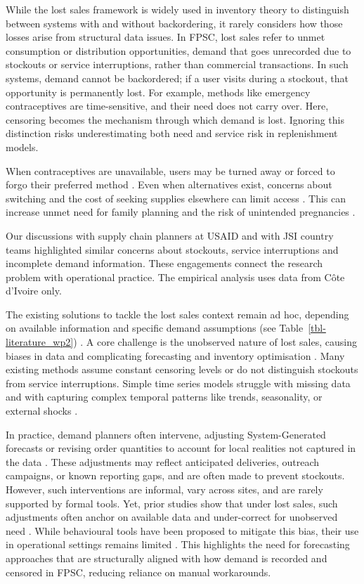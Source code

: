 \documentclass[
  11pt,
  authoryear,
  doubleblind,
  3p]{elsarticle}
\begin{document}
While the lost sales framework is widely used in inventory theory to
distinguish between systems with and without backordering, it rarely
considers how those losses arise from structural data issues. In FPSC,
lost sales refer to unmet consumption or distribution opportunities,
demand that goes unrecorded due to stockouts or service interruptions,
rather than commercial transactions. In such systems, demand cannot be
backordered; if a user visits during a stockout, that opportunity is
permanently lost. For example, methods like emergency contraceptives are
time-sensitive, and their need does not carry over. Here, censoring
becomes the mechanism through which demand is lost. Ignoring this
distinction risks underestimating both need and service risk in
replenishment models.

When contraceptives are unavailable, users may be turned away or forced
to forgo their preferred method \citep{sedgh2016}. Even when
alternatives exist, concerns about switching and the cost of seeking
supplies elsewhere can limit access \citep{karimi2021, RHSC2016}. This
can increase unmet need for family planning and the risk of unintended
pregnancies \citep{sully2020}.

Our discussions with supply chain planners at USAID and with JSI country
teams highlighted similar concerns about stockouts, service
interruptions and incomplete demand information. These engagements
connect the research problem with operational practice. The empirical
analysis uses data from Côte d'Ivoire only.

The existing solutions to tackle the lost sales context remain ad hoc,
depending on available information and specific demand assumptions (see
Table~\ref{tbl-literature_wp2}) \citep{trapero2024}. A core challenge is
the unobserved nature of lost sales, causing biases in data and
complicating forecasting and inventory optimisation
\citep{beutel2012, pedregal}. Many existing methods assume constant
censoring levels or do not distinguish stockouts from service
interruptions. Simple time series models struggle with missing data and
with capturing complex temporal patterns like trends, seasonality, or
external shocks \citep{hewage2025}.

In practice, demand planners often intervene, adjusting System-Generated
forecasts or revising order quantities to account for local realities
not captured in the data \citep{siemsen2025, hewage2025}. These
adjustments may reflect anticipated deliveries, outreach campaigns, or
known reporting gaps, and are often made to prevent stockouts. However,
such interventions are informal, vary across sites, and are rarely
supported by formal tools. Yet, prior studies show that under lost
sales, such adjustments often anchor on available data and under-correct
for unobserved need \citep{feiler2013, tong2018}. While behavioural
tools have been proposed to mitigate this bias, their use in operational
settings remains limited \citep{syntetos2016}. This highlights the need
for forecasting approaches that are structurally aligned with how demand
is recorded and censored in FPSC, reducing reliance on manual
workarounds.
\end{document}
